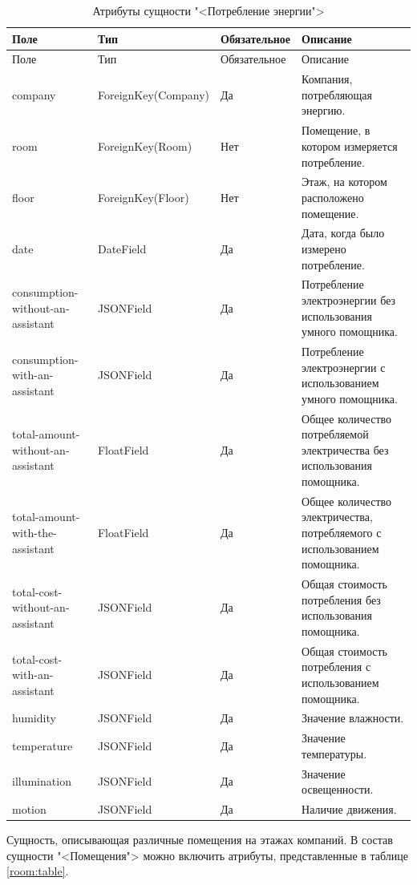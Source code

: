 \begin{xltabular}{\textwidth}{|p{4cm}|l|p{1.7cm}|X|}
	\caption{Атрибуты сущности "<Потребление энергии">\label{potrenergy:table}}\\ \hline
	\centrow Поле & \centrow Тип & \centrow Обяза\-тельное & \centrow Описание \\ \hline
	\endfirsthead
	\centrow Поле & \centrow Тип & \centrow Обяза\-тельное & \centrow Описание \\ \hline
	\finishhead
	company & ForeignKey(Company) & Да & Компания, потребляющая энергию. \\ \hline
	room & ForeignKey(Room) & Нет & Помещение, в котором измеряется потребление. \\ \hline
	floor & ForeignKey(Floor) & Нет & Этаж, на котором расположено помещение. \\ \hline
	date & DateField & Да & Дата, когда было измерено потребление. \\ \hline
	consumption-without-an-assistant & JSONField & Да & Потребление электроэнергии без использования умного помощника. \\ \hline
	consumption-with-an-assistant & JSONField & Да & Потребление электроэнергии с использованием умного помощника. \\ \hline
	total-amount-without-an-assistant & FloatField & Да & Общее количество потребляемой электричества без использования помощника. \\ \hline
	total-amount-with-the-assistant & FloatField & Да & Общее количество электричества, потребляемого с использованием помощника. \\ \hline
	total-cost-without-an-assistant & JSONField & Да & Общая стоимость потребления без использования помощника.\\ \hline
	total-cost-with-an-assistant & JSONField & Да & Общая стоимость потребления с использованием помощника. \\ \hline
	humidity & JSONField & Да & Значение влажности.\\ \hline
	temperature & JSONField & Да & Значение температуры. \\ \hline
	illumination & JSONField & Да & Значение освещенности.\\ \hline
	motion & JSONField & Да & Наличие движения.
\end{xltabular}
 
Сущность, описывающая различные помещения на этажах компаний. В состав сущности "<Помещения"> можно включить атрибуты, представленные в таблице \ref{room:table}.

